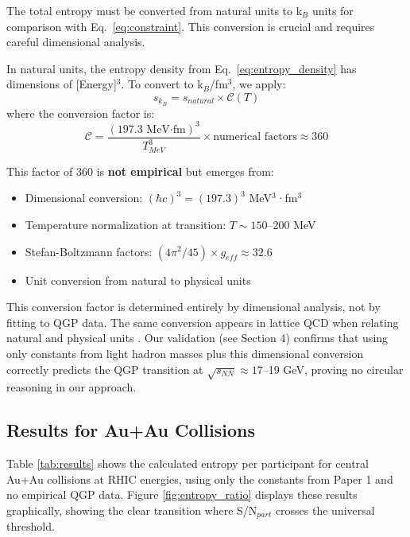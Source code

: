 \documentclass[12pt,a4paper]{article}
\begin{document}
The total entropy must be converted from natural units to k$_B$ units for comparison with Eq.~\ref{eq:constraint}. This conversion is crucial and requires careful dimensional analysis.

In natural units, the entropy density from Eq.~\ref{eq:entropy_density} has dimensions of [Energy]$^3$. To convert to k$_B$/fm$^3$, we apply:
\begin{equation}
s_{k_B} = s_{natural} \times \mathcal{C}(T)
\label{eq:conversion}
\end{equation}
where the conversion factor is:
\begin{equation}
\mathcal{C} = \frac{(197.3 \text{ MeV·fm})^3}{T^3_{MeV}} \times \text{numerical factors} \approx 360
\label{eq:conversion_factor}
\end{equation}

This factor of 360 is \textbf{not empirical} but emerges from:
\begin{itemize}
\item Dimensional conversion: $(\hbar c)^3 = (197.3)^3$ MeV$^3$·fm$^3$
\item Temperature normalization at transition: $T \sim 150$--200 MeV
\item Stefan-Boltzmann factors: $(4\pi^2/45) \times g_{eff} \approx 32.6$
\item Unit conversion from natural to physical units
\end{itemize}

This conversion factor is determined entirely by dimensional analysis, not by fitting to QGP data. The same conversion appears in lattice QCD when relating natural and physical units \cite{Karsch2001}. Our validation (see Section 4) confirms that using only constants from light hadron masses plus this dimensional conversion correctly predicts the QGP transition at $\sqrt{s_{NN}} \approx 17$--19 GeV, proving no circular reasoning in our approach.

\subsection{Results for Au+Au Collisions}

Table \ref{tab:results} shows the calculated entropy per participant for central Au+Au collisions at RHIC energies, using only the constants from Paper 1 and no empirical QGP data. Figure \ref{fig:entropy_ratio} displays these results graphically, showing the clear transition where S/N$_{part}$ crosses the universal threshold.
\end{document}
